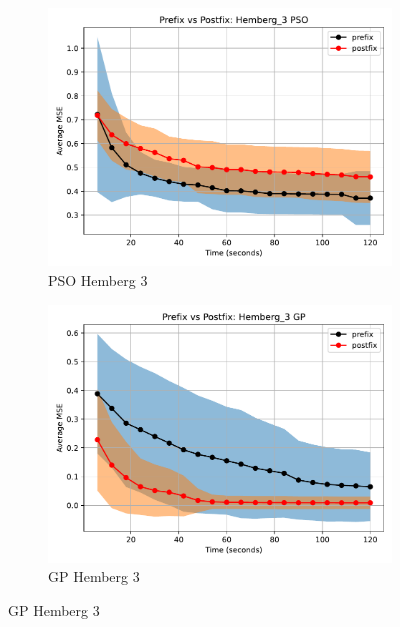 \documentclass[12pt]{iopart}
\begin{document}
\begin{figure}
    \vspace{0.5cm}
    
    \begin{subfigure}[b]{0.4\textwidth}
        \includegraphics[width=\linewidth, keepaspectratio]{Hemberg_Benchmarks/PrePostHemberg_3PSO.pdf}
        \caption{PSO Hemberg 3}
        \label{subfig:hemberg_3_PSO}
    \end{subfigure}
    \begin{subfigure}[b]{0.4\textwidth}
        \includegraphics[width=\linewidth, keepaspectratio]{Hemberg_Benchmarks/PrePostHemberg_3GP.pdf}
        \caption{GP Hemberg 3}
        \label{subfig:hemberg_3_GP}
    \end{subfigure}
    

\end{figure}
\end{document}
